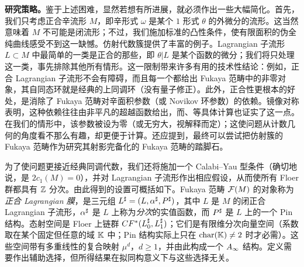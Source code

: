 \noindent\textbf{研究策略。}鉴于上述困难，显然若想有所进展，就必须作出一些大幅简化。首先，我们只考虑正合辛流形 $M$，即辛形式 $\omega$ 是某个 $1$ 形式 $\theta$ 的外微分的流形。这当然意味着 $M$ 不可能是闭流形；不过，我们施加标准的凸性条件，使有限面积的伪全纯曲线感受不到这一缺憾。仿射代数簇提供了丰富的例子。Lagrangian 子流形 $L\subset M$ 中最简单的一类是正合的那些，即 $\theta|L$ 是某个函数的微分；我们将只处理这一类，事先排除其他所有情形。这一限制带来许多有用的技术性结论：例如，正合 Lagrangian 子流形不会有障碍，而且每一个都给出 Fukaya 范畴中的非零对象，其自同态环就是经典的上同调环（没有量子修正）。此外，正合性更根本的好处，是消除了 Fukaya 范畴对辛面积参数（或 Novikov 环参数）的依赖。镜像对称表明，这种依赖往往由非平凡的超越函数给出，而、等具体计算也证实了这一点。在我们的情形中，该参数被设为零（或无穷大，视解释而定）；这使问题从计数几何的角度看不那么有趣，却更便于计算。还应提到，最终可以尝试把仿射簇的 Fukaya 范畴作为研究其射影完备化的 Fukaya 范畴的踏脚石。

为了使问题更接近经典同调代数，我们还将施加一个 Calabi–Yau 型条件（确切地说，是 $2c_1(M)=0$），并对 Lagrangian 子流形作出相应假设，从而使所有 Floer 群都具有 $\mathbb Z$ 分次。由此得到的设置可概括如下。Fukaya 范畴 $\mathcal F(M)$ 的对象称为\emph{正合 Lagrangian 膜}，是三元组 $L^{\sharp}=(L,\alpha^{\sharp},P^{\sharp})$，其中 $L$ 是 $M$ 的闭正合 Lagrangian 子流形，$\alpha^{\sharp}$ 是 $L$ 上称为\emph{分次}的实值函数，而 $P^{\sharp}$ 是 $L$ 上的一个 Pin 结构。态射空间是 Floer 上链群 $CF^*(L_0^{\sharp},L_1^{\sharp})$；它们是有限维分次向量空间（系数取在某个固定但任意的域 $\mathbb K$ 中；Pin 结构实际上只在 $\operatorname{char}(\mathbb K)\ne2$ 时才必需）。这些空间带有多重线性的复合映射 $\mu^d$，$d\ge1$，并由此构成一个 $A_\infty$ 结构。定义需要作出辅助选择，但所得结果在拟同构意义下与这些选择无关。

